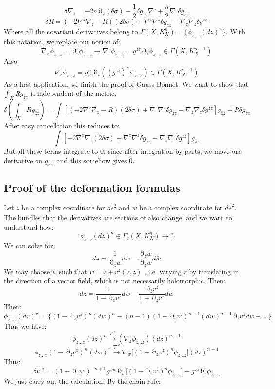 \documentclass[12 pt]{article}
\DeclareMathOperator {\p} {\partial}
\theoremstyle{plain}
\theoremstyle{definition}
\theoremstyle{remark}
\begin{document}
\[       \delta \nabla_z = -2 n \p_z(\delta \sigma)  - \frac{1}{2} \delta g_{zz} \nabla^z + \frac{n}{2} \nabla^z \delta g_{zz}       \]
\[       \delta R = ( -2 \nabla^z \nabla_z - R) (2 \delta \sigma) + \nabla^z \nabla^z \delta g_{zz} - \nabla_z \nabla_z \delta g^{zz}        \]
Where all the covariant derivatives belong to $\Gamma(X, K_X^n) = \{ \phi_{z ... z} (dz)^n \}$. With this notation, we replace our notion of:
\[     \nabla_{\bar z} \phi_{z...z} = \p_{\bar z} \phi_{z...z} \longrightarrow \nabla^z \phi_{z...z} = g^{z\bar z} \p_{\bar z} \phi_{z...z} \in \Gamma(X, K_X^{n-1})     \]
Also:
\[       \nabla_z \phi_{z...z} = g^n_{z\bar z} \p_z ((g^{z\bar z})^n \phi_{z...z}) \in \Gamma(X, K_X^{n+1})      \]
As a first application, we finish the proof of Gauss-Bonnet. We want to show that $\int_X R g_{\bar z z}$ is independent of the metric.
\[        \delta \left(  \int_X R g_{\bar z z}  \right)  = \int  \left[  ( -2 \nabla^z \nabla_z - R) (2 \delta \sigma) + \nabla^z \nabla^z \delta g_{zz} - \nabla_z \nabla_z \delta g^{zz} \right] g_{\bar z z} + R \delta g_{\bar z z}     \]
After easy cancellation this reduces to:
\[           \int  \left[   -2 \nabla^z \nabla_z  (2 \delta \sigma) + \nabla^z \nabla^z \delta g_{zz} - \nabla_z \nabla_z \delta g^{zz} \right] g_{\bar z z}        \]
But all these terms integrate to 0, since after integration by parts, we move one derivative on $g_{\bar z z}$, and this somehow gives 0.

\subsection*{Proof of the deformation formulas}
Let $z$ be a complex coordinate for $ds^2$ and $w$ be a complex coordinate for $d\tilde s^2$. The bundles that the derivatives are sections of also change, and we want to understand how:
\[       \phi_{z...z}(dz)^n \in  \Gamma_z(X, K_X^n)     \to ?    \]
We can solve for:
\[      dz = \frac{1}{\p_z w} dw - \frac{\p_{\bar z} w}{\p_{z} w} d\bar w      \]
We may choose $w$ such that $w = z + v^z (z, \bar z)$ , i.e. varying $z$ by translating in the direction of a vector field, which is not necessarily holomorphic. Then:
\[           dz = \frac{1}{1- \p_z v^z} dw - \frac{\p_{\bar z} v^z}{1+ \p_{z} v^z} d\bar w         \]
Then:
\[    \phi_{z...z} (dz)^n = \{  (1 - \p_z v^z)^n (dw)^n - (n-1) (1- \p_z v^z)^{n-1} (dw)^{n-1} \p_{\bar z} v^z d \bar w + ...   \}      \]
Thus we have:
\[ \phi_{z...z} (dz)^n     \overset{\nabla^z}{\longrightarrow}   (\nabla_z \phi_{z...z})(dz)^{n-1}          \]
\[         \phi_{z...z}(1 - \p_{z} v^z)^n (dw)^n     \overset{\nabla^w}{\longrightarrow}   \nabla_w \big[(1 - \p_z v^z)^n \phi_{z...z}\big](dz)^{n-1}              \]
Thus:
\[          \delta \nabla^z =  (1 - \p_z v^z)^{-n+1} g^{w\bar w} \p_{\bar w} \big[(1 - \p_z v^z)^n \phi_{z...z}\big] - g^{z \bar z} \p_{\bar z} \phi_{z...z}        \]
We just carry out the calculation. By the chain rule:
\[            \]
\end{document}
